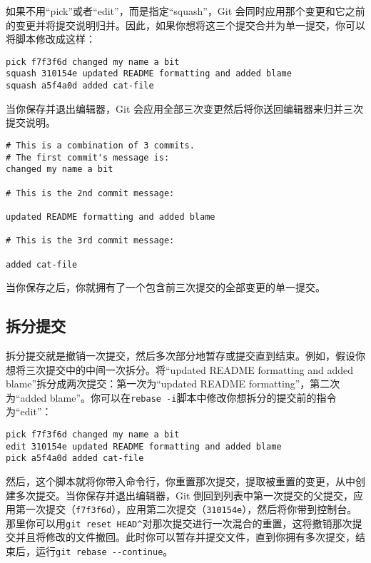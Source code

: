 \documentclass[a4paper]{book}
\begin{document}
如果不用“pick”或者“edit”，而是指定“squash”，Git 会同时应用那个变更和它之前的变更并将提交说明归并。因此，如果你想将这三个提交合并为单一提交，你可以将脚本修改成这样：

\begin{shaded}\begin{verbatim}
pick f7f3f6d changed my name a bit
squash 310154e updated README formatting and added blame
squash a5f4a0d added cat-file
\end{verbatim}\end{shaded}

当你保存并退出编辑器，Git 会应用全部三次变更然后将你送回编辑器来归并三次提交说明。

\begin{shaded}\begin{verbatim}
# This is a combination of 3 commits.
# The first commit's message is:
changed my name a bit

# This is the 2nd commit message:

updated README formatting and added blame

# This is the 3rd commit message:

added cat-file
\end{verbatim}\end{shaded}

当你保存之后，你就拥有了一个包含前三次提交的全部变更的单一提交。

\subsection{拆分提交}

拆分提交就是撤销一次提交，然后多次部分地暂存或提交直到结束。例如，假设你想将三次提交中的中间一次拆分。将“updated README formatting and added blame”拆分成两次提交：第一次为“updated README formatting”，第二次为“added blame”。你可以在\texttt{rebase -i}脚本中修改你想拆分的提交前的指令为“edit”：

\begin{shaded}\begin{verbatim}
pick f7f3f6d changed my name a bit
edit 310154e updated README formatting and added blame
pick a5f4a0d added cat-file
\end{verbatim}\end{shaded}

然后，这个脚本就将你带入命令行，你重置那次提交，提取被重置的变更，从中创建多次提交。当你保存并退出编辑器，Git 倒回到列表中第一次提交的父提交，应用第一次提交（\texttt{f7f3f6d}），应用第二次提交（\texttt{310154e}），然后将你带到控制台。那里你可以用\texttt{git reset HEAD\^{}}对那次提交进行一次混合的重置，这将撤销那次提交并且将修改的文件撤回。此时你可以暂存并提交文件，直到你拥有多次提交，结束后，运行\texttt{git rebase -{}-continue}。
\end{document}
